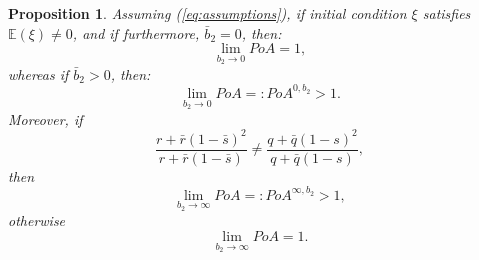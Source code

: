 \documentclass[11pt]{article}
\newtheorem{proposition}{Proposition}
\begin{document}
\begin{proposition}
	Assuming (\ref{eq:assumptions}), if initial condition $\xi$ satisfies $\mathbb{E}(\xi)\neq 0$, and if furthermore, $\bar{b}_2= 0$, then:
	\begin{equation*}
	 \lim_{b_2 \to 0} PoA = 1,
	\end{equation*}
	whereas if $\bar{b}_2 > 0$, then:
	\begin{equation*}
	 \lim_{b_2 \to 0} PoA =: PoA^{0,b_2} > 1.
	\end{equation*}
	Moreover, if
		$$ \frac{r + \bar{r}(1-\bar{s})^2}{r + \bar{r}(1-\bar{s})} \neq \frac{q + \bar{q}(1-s)^2}{q + \bar{q}(1-s)},$$
	then
	$$\lim_{b_2 \to \infty} PoA =: PoA^{\infty, b_2} > 1,$$
	otherwise
	$$ \lim_{b_2 \to \infty} PoA = 1.$$	
	\label{prop:b2}
\end{proposition}
\end{document}
